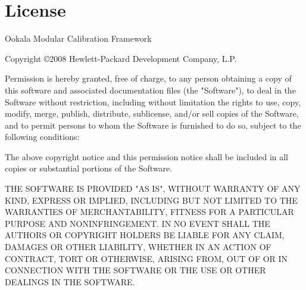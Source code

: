 
\section{License}

Ookala Modular Calibration Framework 

Copyright \copyright  2008 Hewlett-Packard Development Company, L.P.  

Permission is hereby granted, free of charge, to any person obtaining 
a copy of this software and associated documentation files (the "Software"), 
to deal in the Software without restriction, including without limitation 
the rights to use, copy, modify, merge, publish, distribute, sublicense, 
and/or sell copies of the Software, and to permit persons to whom the 
Software is furnished to do so, subject to the following conditions: 

The above copyright notice and this permission notice shall 
be included in all copies or substantial portions of the Software.  

THE SOFTWARE IS PROVIDED "AS IS", WITHOUT WARRANTY OF ANY KIND, 
EXPRESS OR IMPLIED, INCLUDING BUT NOT LIMITED TO THE WARRANTIES OF 
MERCHANTABILITY, FITNESS FOR A PARTICULAR PURPOSE AND NONINFRINGEMENT. 
IN NO EVENT SHALL THE AUTHORS OR COPYRIGHT HOLDERS BE LIABLE FOR ANY 
CLAIM, DAMAGES OR OTHER LIABILITY, WHETHER IN AN ACTION OF CONTRACT, 
TORT OR OTHERWISE, ARISING FROM, OUT OF OR IN CONNECTION WITH THE 
SOFTWARE OR THE USE OR OTHER DEALINGS IN THE SOFTWARE.

